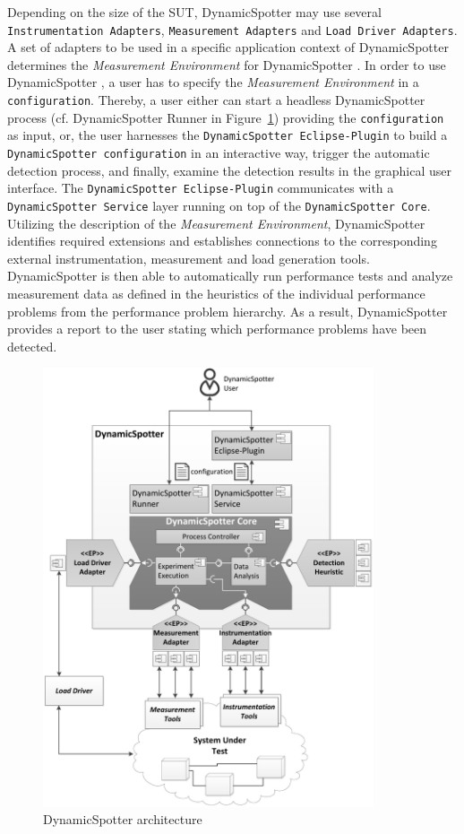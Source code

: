 \documentclass{report}
\newcommand{\DS}{DynamicSpotter }
\begin{document}
Depending on the size of the SUT, \DS may use several \texttt{Instrumentation Adapters}, \texttt{Measurement Adapters}
and \texttt{Load Driver Adapters}. A set of adapters to be used in a specific application context of \DS determines the
\emph{Measurement Environment} for \DS. In order to use \DS, a user has to specify the \emph{Measurement Environment} in
a \texttt{configuration}. Thereby, a user either can start a headless \DS process (cf. \DS Runner in Figure~\ref{fig:architecture})
providing the \texttt{configuration} as input, or, the user harnesses the \texttt{\DS Eclipse-Plugin} to build a \texttt{\DS configuration} in an interactive
way, trigger the automatic detection process, and finally, examine the detection results in the graphical user
interface. The \texttt{\DS Eclipse-Plugin} communicates with a \texttt{\DS Service} layer running on top of
the \texttt{\DS Core}. Utilizing the description of the \emph{Measurement Environment}, \DS identifies required
extensions and establishes connections to the corresponding external instrumentation, measurement and load generation
tools. \DS is then able to automatically run performance tests and analyze measurement data as defined in the heuristics
of the individual performance problems from the performance problem hierarchy. As a result, \DS provides a report to the
user stating which performance problems have been detected.  
\begin{figure}[h]
\centering
\includegraphics[width=0.87\textwidth]{figures/architecture.pdf}
\caption{\DS architecture}
\label{fig:architecture}
\end{figure}
\end{document}
